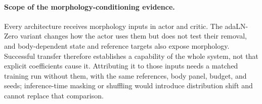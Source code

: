 \paragraph{Scope of the morphology-conditioning evidence.}
Every architecture receives morphology inputs in actor and critic. The adaLN-Zero
variant changes how the actor uses them but does not test their removal, and
body-dependent state and reference targets also expose morphology. Successful
transfer therefore establishes a capability of the whole system, not that
explicit coefficients cause it. Attributing it to those inputs needs a matched
training run without them, with the same references, body panel, budget, and
seeds; inference-time masking or shuffling would introduce distribution shift
and cannot replace that comparison.
